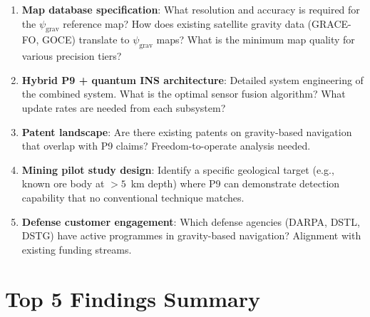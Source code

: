 \documentclass[11pt]{article}
\theoremstyle{definition}
\theoremstyle{remark}
\newcommand{\psigrav}{\psi_{\mathrm{grav}}}
\begin{document}
\begin{enumerate}
\item \textbf{Map database specification}: What resolution and accuracy is
  required for the $\psigrav$ reference map? How does existing satellite
  gravity data (GRACE-FO, GOCE) translate to $\psigrav$ maps? What is
  the minimum map quality for various precision tiers?

\item \textbf{Hybrid P9 + quantum INS architecture}: Detailed system
  engineering of the combined system. What is the optimal sensor fusion
  algorithm? What update rates are needed from each subsystem?

\item \textbf{Patent landscape}: Are there existing patents on gravity-based
  navigation that overlap with P9 claims? Freedom-to-operate analysis needed.

\item \textbf{Mining pilot study design}: Identify a specific geological
  target (e.g., known ore body at $>5$~km depth) where P9 can demonstrate
  detection capability that no conventional technique matches.

\item \textbf{Defense customer engagement}: Which defense agencies
  (DARPA, DSTL, DSTG) have active programmes in gravity-based navigation?
  Alignment with existing funding streams.
\end{enumerate}

\section*{Top 5 Findings Summary}
\end{document}
